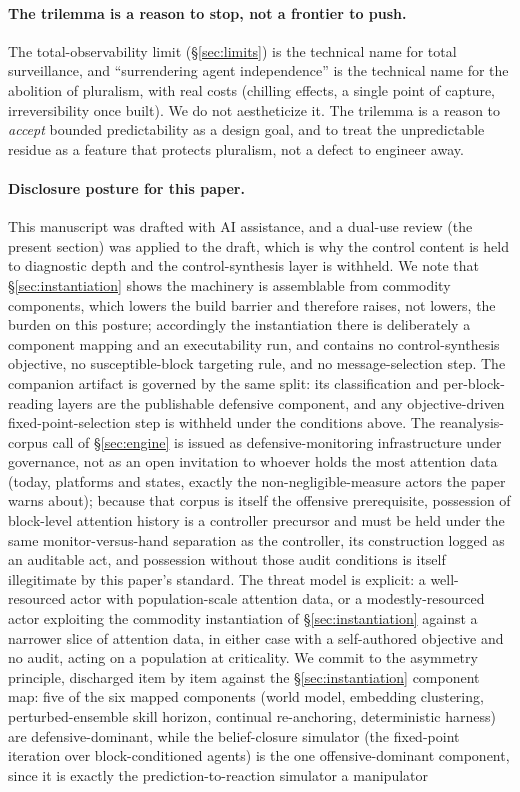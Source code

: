 \documentclass[11pt]{article}
\begin{document}
\paragraph{The trilemma is a reason to stop, not a frontier to push.} The total-observability limit (\S\ref{sec:limits}) is the technical name for total surveillance, and ``surrendering agent independence'' is the technical name for the abolition of pluralism, with real costs (chilling effects, a single point of capture, irreversibility once built). We do not aestheticize it. The trilemma is a reason to \emph{accept} bounded predictability as a design goal, and to treat the unpredictable residue as a feature that protects pluralism, not a defect to engineer away.

\paragraph{Disclosure posture for this paper.} This manuscript was drafted with AI assistance, and a dual-use review (the present section) was applied to the draft, which is why the control content is held to diagnostic depth and the control-synthesis layer is withheld. We note that \S\ref{sec:instantiation} shows the machinery is assemblable from commodity components, which lowers the build barrier and therefore raises, not lowers, the burden on this posture; accordingly the instantiation there is deliberately a component mapping and an executability run, and contains no control-synthesis objective, no susceptible-block targeting rule, and no message-selection step. The companion artifact is governed by the same split: its classification and per-block-reading layers are the publishable defensive component, and any objective-driven fixed-point-selection step is withheld under the conditions above. The reanalysis-corpus call of \S\ref{sec:engine} is issued as defensive-monitoring infrastructure under governance, not as an open invitation to whoever holds the most attention data (today, platforms and states, exactly the non-negligible-measure actors the paper warns about); because that corpus is itself the offensive prerequisite, possession of block-level attention history is a controller precursor and must be held under the same monitor-versus-hand separation as the controller, its construction logged as an auditable act, and possession without those audit conditions is itself illegitimate by this paper's standard. The threat model is explicit: a well-resourced actor with population-scale attention data, or a modestly-resourced actor exploiting the commodity instantiation of \S\ref{sec:instantiation} against a narrower slice of attention data, in either case with a self-authored objective and no audit, acting on a population at criticality. We commit to the asymmetry principle, discharged item by item against the \S\ref{sec:instantiation} component map: five of the six mapped components (world model, embedding clustering, perturbed-ensemble skill horizon, continual re-anchoring, deterministic harness) are defensive-dominant, while the belief-closure simulator (the fixed-point iteration over block-conditioned agents) is the one offensive-dominant component, since it is exactly the prediction-to-reaction simulator a manipulator 
\end{document}
